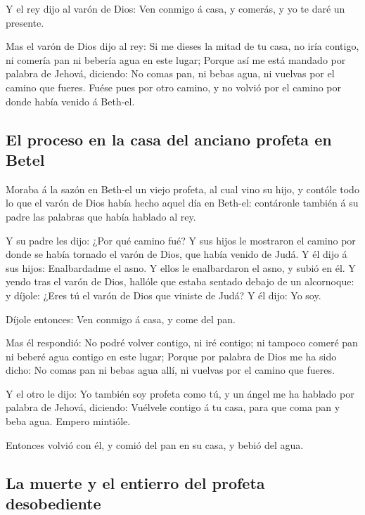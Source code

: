  Y el rey dijo al varón de Dios: Ven conmigo á casa, y
comerás, y yo te daré un presente.

 Mas el varón de Dios dijo al rey: Si me dieses la mitad de
tu casa, no iría contigo, ni comería pan ni bebería agua en este lugar;
 Porque así me está mandado por palabra de Jehová, diciendo:
No comas pan, ni bebas agua, ni vuelvas por el camino que fueres.
 Fuése pues por otro camino, y no volvió por el camino por
donde había venido á Beth-el.

\hypertarget{el-proceso-en-la-casa-del-anciano-profeta-en-betel}{%
\subsection{El proceso en la casa del anciano profeta en
Betel}\label{el-proceso-en-la-casa-del-anciano-profeta-en-betel}}

 Moraba á la sazón en Beth-el un viejo profeta, al cual
vino su hijo, y contóle todo lo que el varón de Dios había hecho aquel
día en Beth-el: contáronle también á su padre las palabras que había
hablado al rey.

 Y su padre les dijo: ¿Por qué camino fué? Y sus hijos le
mostraron el camino por donde se había tornado el varón de Dios, que
había venido de Judá.  Y él dijo á sus hijos: Enalbardadme
el asno. Y ellos le enalbardaron el asno, y subió en él.  Y
yendo tras el varón de Dios, hallóle que estaba sentado debajo de un
alcornoque: y díjole: ¿Eres tú el varón de Dios que viniste de Judá? Y
él dijo: Yo soy.

 Díjole entonces: Ven conmigo á casa, y come del pan.

 Mas él respondió: No podré volver contigo, ni iré contigo;
ni tampoco comeré pan ni beberé agua contigo en este lugar;
 Porque por palabra de Dios me ha sido dicho: No comas pan
ni bebas agua allí, ni vuelvas por el camino que fueres.

 Y el otro le dijo: Yo también soy profeta como tú, y un
ángel me ha hablado por palabra de Jehová, diciendo: Vuélvele contigo á
tu casa, para que coma pan y beba agua. Empero mintióle.

 Entonces volvió con él, y comió del pan en su casa, y
bebió del agua.

\hypertarget{la-muerte-y-el-entierro-del-profeta-desobediente}{%
\subsection{La muerte y el entierro del profeta
desobediente}\label{la-muerte-y-el-entierro-del-profeta-desobediente}}

